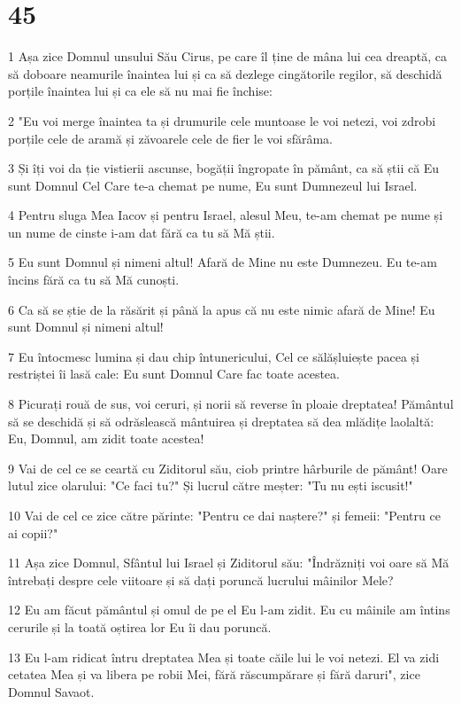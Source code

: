 \chapter{45}

\par 1 Așa zice Domnul unsului Său Cirus, pe care îl ține de mâna lui cea dreaptă, ca să doboare neamurile înaintea lui și ca să dezlege cingătorile regilor, să deschidă porțile înaintea lui și ca ele să nu mai fie închise:
\par 2 "Eu voi merge înaintea ta și drumurile cele muntoase le voi netezi, voi zdrobi porțile cele de aramă și zăvoarele cele de fier le voi sfărâma.
\par 3 Și îți voi da ție vistierii ascunse, bogății îngropate în pământ, ca să știi că Eu sunt Domnul Cel Care te-a chemat pe nume, Eu sunt Dumnezeul lui Israel.
\par 4 Pentru sluga Mea Iacov și pentru Israel, alesul Meu, te-am chemat pe nume și un nume de cinste i-am dat fără ca tu să Mă știi.
\par 5 Eu sunt Domnul și nimeni altul! Afară de Mine nu este Dumnezeu. Eu te-am încins fără ca tu să Mă cunoști.
\par 6 Ca să se știe de la răsărit și până la apus că nu este nimic afară de Mine! Eu sunt Domnul și nimeni altul!
\par 7 Eu întocmesc lumina și dau chip întunericului, Cel ce sălășluiește pacea și restriștei îi lasă cale: Eu sunt Domnul Care fac toate acestea.
\par 8 Picurați rouă de sus, voi ceruri, și norii să reverse în ploaie dreptatea! Pământul să se deschidă și să odrăslească mântuirea și dreptatea să dea mlădițe laolaltă: Eu, Domnul, am zidit toate acestea!
\par 9 Vai de cel ce se ceartă cu Ziditorul său, ciob printre hârburile de pământ! Oare lutul zice olarului: "Ce faci tu?" Și lucrul către meșter: "Tu nu ești iscusit!"
\par 10 Vai de cel ce zice către părinte: "Pentru ce dai naștere?" și femeii: "Pentru ce ai copii?"
\par 11 Așa zice Domnul, Sfântul lui Israel și Ziditorul său: "Îndrăzniți voi oare să Mă întrebați despre cele viitoare și să dați poruncă lucrului mâinilor Mele?
\par 12 Eu am făcut pământul și omul de pe el Eu l-am zidit. Eu cu mâinile am întins cerurile și la toată oștirea lor Eu îi dau poruncă.
\par 13 Eu l-am ridicat întru dreptatea Mea și toate căile lui le voi netezi. El va zidi cetatea Mea și va libera pe robii Mei, fără răscumpărare și fără daruri", zice Domnul Savaot.
